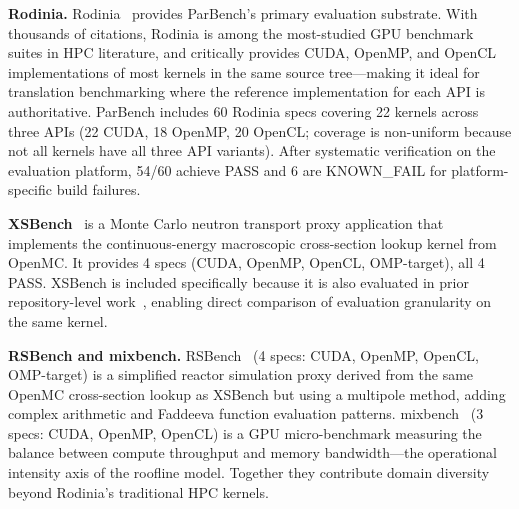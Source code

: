 \textbf{Rodinia.} Rodinia~\cite{Rodinia2009} provides ParBench's primary evaluation substrate. With thousands of citations, Rodinia is among the most-studied GPU benchmark suites in HPC literature, and critically provides CUDA, OpenMP, and OpenCL implementations of most kernels in the same source tree---making it ideal for translation benchmarking where the reference implementation for each API is authoritative. ParBench includes 60 Rodinia specs covering 22 kernels across three APIs (22 CUDA, 18 OpenMP, 20 OpenCL; coverage is non-uniform because not all kernels have all three API variants). After systematic verification on the evaluation platform, 54/60 achieve PASS and 6 are KNOWN\_FAIL for platform-specific build failures.




\textbf{XSBench}~\cite{XSBench2014} is a Monte Carlo neutron transport proxy application that implements the continuous-energy macroscopic cross-section lookup kernel from OpenMC. It provides 4 specs (CUDA, OpenMP, OpenCL, OMP-target), all 4 PASS. XSBench is included specifically because it is also evaluated in prior repository-level work~\cite{ParEvalRepo2025}, enabling direct comparison of evaluation granularity on the same kernel.

\textbf{RSBench and mixbench.} RSBench~\cite{RSBench2014} (4 specs: CUDA, OpenMP, OpenCL, OMP-target) is a simplified reactor simulation proxy derived from the same OpenMC cross-section lookup as XSBench but using a multipole method, adding complex arithmetic and Faddeeva function evaluation patterns. mixbench~\cite{mixbench2017} (3 specs: CUDA, OpenMP, OpenCL) is a GPU micro-benchmark measuring the balance between compute throughput and memory bandwidth---the operational intensity axis of the roofline model. Together they contribute domain diversity beyond Rodinia's traditional HPC kernels.

